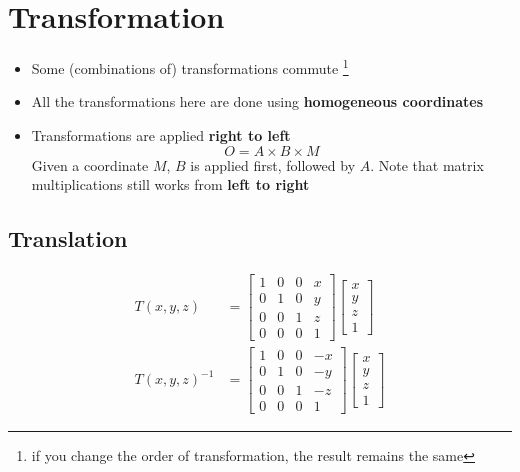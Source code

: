 \chapter{Transformation}

\begin{itemize}
  \item Some (combinations of) transformations commute
  \footnote{if you change the order of transformation, the result remains the
  same}
  \item All the transformations here are done using \textbf{homogeneous
  coordinates}
  \item Transformations are applied \textbf{right to left}
  \begin{equation*}
    O = A \times B \times M
  \end{equation*}
  Given a coordinate $ M $, $ B $ is applied first, followed by $ A $. Note
  that matrix multiplications still works from \textbf{left to right}
\end{itemize}

\section{Translation}

  \begin{align}
    T\left( x, y, z \right) &=
    \begin{bmatrix}
      1 & 0 & 0 & x \\
      0 & 1 & 0 & y \\
      0 & 0 & 1 & z \\
      0 & 0 & 0 & 1
    \end{bmatrix}
    \begin{bmatrix}
      x \\
      y \\
      z \\
      1
    \end{bmatrix} \\
    T\left( x, y, z \right)^{-1} &=
    \begin{bmatrix}
      1 & 0 & 0 & -x \\
      0 & 1 & 0 & -y \\
      0 & 0 & 1 & -z \\
      0 & 0 & 0 & 1
    \end{bmatrix}
    \begin{bmatrix}
      x \\
      y \\
      z \\
      1
    \end{bmatrix}
  \end{align}

